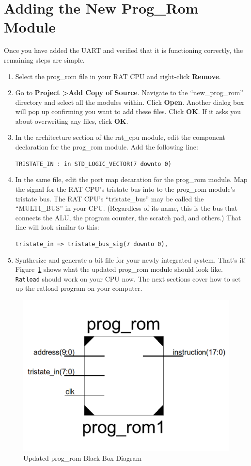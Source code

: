 \documentclass[notitlepage]{article}
\begin{document}
\section{Adding the New Prog\_Rom Module}
Once you have added the UART and verified that it is functioning correctly, the remaining steps are simple.
\begin{enumerate}
\item Select the prog\_rom file in your RAT CPU and right-click \textbf{Remove}.

\item Go to \textbf{Project \textgreater Add Copy of Source}. Navigate to the ``new\_prog\_rom'' directory and select all the modules within. Click \textbf{Open}. Another dialog box will pop up confirming you want to add these files. Click \textbf{OK}. If it asks you about overwriting any files, click \textbf{OK}.

\item In the architecture section of the rat\_cpu module, edit the component declaration for the prog\_rom module. Add the following line:\\
  \centerline{\texttt{TRISTATE\_IN : in STD\_LOGIC\_VECTOR(7 downto 0)}}

\item In the same file, edit the port map decaration for the prog\_rom module. Map the signal for the RAT CPU's tristate bus into to the prog\_rom module's tristate bus. The RAT CPU's ``tristate\_bus'' may be called the ``MULTI\_BUS'' in your CPU. (Regardless of its name, this is the bus that connects the ALU, the program counter, the scratch pad, and others.) That line will look similar to this:\\
  \centerline{\texttt{tristate\_in =\textgreater ~tristate\_bus\_sig(7 downto 0),}}

\item Synthesize and generate a bit file for your newly integrated system. That's it! Figure~\ref{fig:progrom} shows what the updated prog\_rom module should look like. \texttt{Ratload} should work on your CPU now. The next sections cover how to set up the ratload program on your computer.
\end{enumerate}

\begin{figure}[ht!]
  \centering
  \includegraphics[width=.5\textwidth]{prog_rom.png}
  \caption{Updated prog\_rom Black Box Diagram}
  \label{fig:progrom}
\end{figure}
\end{document}
